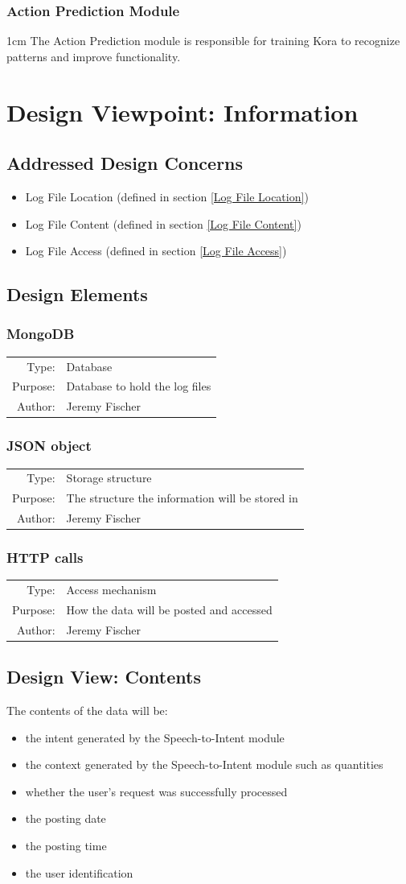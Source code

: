 \documentclass[onecolumn, draftclsnofoot,10pt, compsoc]{IEEEtran}
\def \botname{Kora\xspace}
\newenvironment{indentItem}[1][1cm]{\begin{adjustwidth}{#1}{}}{\end{adjustwidth}}
\newcommand{\designConcernRef}[1]{
    #1 (defined in section \ref{#1})
}
\newcommand{\designElementDef}[4]{
    \subsubsection{#1}\label{#1}
        \begin{tabular}[t]{r p{6in}}
            Type: & #2 \\
            Purpose: & #3 \\
            Author: & #4 \\
        \end{tabular}
}
\begin{document}
		\subsubsection{Action Prediction Module}
			\begin{indentItem}
				The Action Prediction module is responsible for training \botname to recognize patterns and improve functionality.
			\end{indentItem}
		
\section{Design Viewpoint: Information}
	\subsection{Addressed Design Concerns}
		\begin{itemize}
			\item \designConcernRef{Log File Location}
			\item \designConcernRef{Log File Content}
			\item \designConcernRef{Log File Access}
		\end{itemize}


	\subsection{Design Elements}
		\designElementDef{MongoDB}{Database}{Database to hold the log files}{Jeremy Fischer}
		\designElementDef{JSON object}{Storage structure}{The structure the information will be stored in}{Jeremy Fischer}
		\designElementDef{HTTP calls}{Access mechanism}{How the data will be posted and accessed}{Jeremy Fischer}
	
	\subsection{Design View: Contents}
		The contents of the data will be:
		\begin{itemize}
			\item the intent generated by the Speech-to-Intent module
			\item the context generated by the Speech-to-Intent module such as quantities
			\item whether the user's request was successfully processed
			\item the posting date
			\item the posting time
			\item the user identification
		\end{itemize}
	
\end{document}
